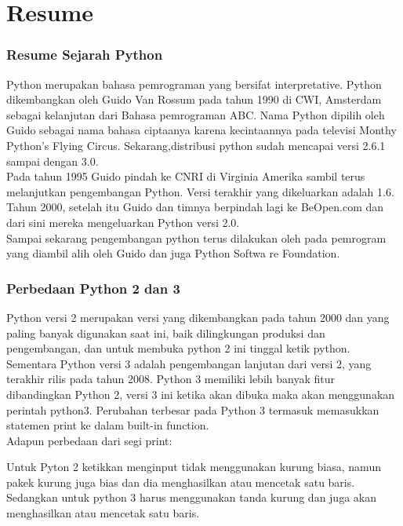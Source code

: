 \documentclass[11pt]{Article}
\begin{document}
\section{Resume} 
\label{Resume}
\subsubsection{Resume Sejarah Python}

Python merupakan bahasa pemrograman yang bersifat interpretative. Python dikembangkan oleh Guido Van Rossum pada tahun 1990 di CWI, Amsterdam sebagai kelanjutan dari Bahasa pemrograman ABC. Nama Python dipilih oleh Guido sebagai nama bahasa ciptaanya karena kecintaannya pada televisi Monthy Python’s Flying Circus. Sekarang,distribusi python sudah mencapai versi 2.6.1 sampai dengan 3.0.\\

Pada tahun 1995 Guido pindah ke CNRI di Virginia Amerika sambil terus melanjutkan pengembangan Python. Versi terakhir yang dikeluarkan adalah 1.6. Tahun 2000, setelah itu Guido dan timnya berpindah lagi ke BeOpen.com dan dari sini mereka mengeluarkan Python versi 2.0.\\

Sampai sekarang pengembangan python terus dilakukan oleh pada pemrogram yang diambil alih oleh  Guido dan juga Python Softwa
re Foundation. 

\subsubsection{Perbedaan Python 2 dan 3}

Python versi 2 merupakan versi yang dikembangkan pada tahun 2000 dan yang paling banyak digunakan saat ini, baik dilingkungan produksi dan pengembangan, dan untuk membuka python 2 ini tinggal ketik python.\\
 
Sementara Python versi 3 adalah pengembangan lanjutan dari versi 2, yang terakhir rilis pada tahun 2008. Python 3 memiliki lebih banyak fitur dibandingkan Python 2, versi 3 ini ketika akan dibuka maka akan menggunakan perintah python3. Perubahan terbesar pada Python 3 termasuk memasukkan statemen print ke dalam built-in function.\\

Adapun perbedaan dari segi print:

Untuk Pyton 2 ketikkan menginput tidak menggunakan kurung biasa, namun pakek kurung juga bias dan dia menghasilkan atau mencetak satu baris. Sedangkan untuk python 3 harus menggunakan tanda kurung dan juga akan menghasilkan atau mencetak satu baris.\\
\end{document}
